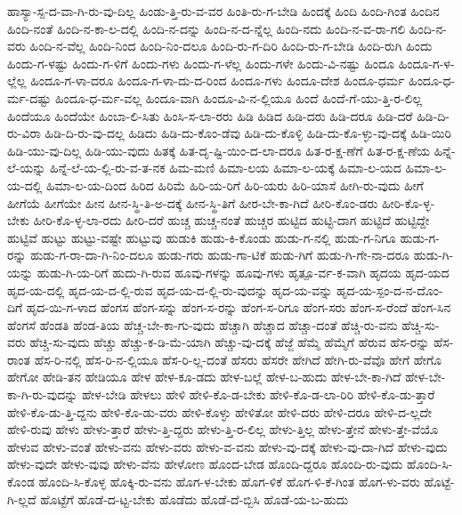 {ಹಾಸ್ಯಾ-ಸ್ಪ-ದ-ವಾ-ಗಿ-ರು-ವು-ದಿಲ್ಲ
ಹಿಂಡು-ತ್ತಿ-ರು-ವ-ವರ
ಹಿಂತಿ-ರು-ಗ-ಬೇಡಿ
ಹಿಂದಕ್ಕೆ
ಹಿಂದಿ
ಹಿಂದಿ-ಗಿಂತ
ಹಿಂದಿನ
ಹಿಂದಿ-ನಂತೆ
ಹಿಂದಿ-ನ-ಕಾ-ಲ-ದಲ್ಲಿ
ಹಿಂದಿ-ನ-ದನ್ನು
ಹಿಂದಿ-ನ-ದ-ನ್ನೆಲ್ಲ
ಹಿಂದಿ-ನದು
ಹಿಂದಿ-ನ-ವ-ರಾ-ಗಲಿ
ಹಿಂದಿ-ನ-ವರು
ಹಿಂದಿ-ನ-ವೆಲ್ಲ
ಹಿಂದಿ-ನಿಂದ
ಹಿಂದಿ-ನಿಂ-ದಲೂ
ಹಿಂದಿ-ರು-ಗ-ದಿರಿ
ಹಿಂದಿ-ರು-ಗ-ಬೇಡಿ
ಹಿಂದಿ-ರುಗಿ
ಹಿಂದು
ಹಿಂದು-ಗ-ಳಷ್ಟು
ಹಿಂದು-ಗ-ಳಿಗೆ
ಹಿಂದು-ಗಳು
ಹಿಂದು-ಗ-ಳೆಲ್ಲ
ಹಿಂದು-ಗಳೇ
ಹಿಂದು-ವಿ-ನಷ್ಟು
ಹಿಂದೂ
ಹಿಂದೂ-ಗ-ಳ-ಲ್ಲೆಲ್ಲ
ಹಿಂದೂ-ಗ-ಳಾ-ದರೂ
ಹಿಂದೂ-ಗ-ಳಾ-ದು-ದ-ರಿಂದ
ಹಿಂದೂ-ಗಳು
ಹಿಂದೂ-ದೇಶ
ಹಿಂದೂ-ಧರ್ಮ
ಹಿಂದೂ-ಧ-ರ್ಮ-ದಷ್ಟು
ಹಿಂದೂ-ಧ-ರ್ಮ-ವಲ್ಲ
ಹಿಂದೂ-ವಾಗಿ
ಹಿಂದೂ-ವಿ-ನ-ಲ್ಲಿಯೂ
ಹಿಂದೆ
ಹಿಂದೆ-ಗೆ-ಯು-ತ್ತಿ-ರ-ಲಿಲ್ಲ
ಹಿಂದೆಯೂ
ಹಿಂದೆಯೇ
ಹಿಂಬಾ-ಲಿ-ಸಿತು
ಹಿಂಸಿ-ಸ-ಲಾ-ರರು
ಹಿಡಿ
ಹಿಡಿದ
ಹಿಡಿ-ದರು
ಹಿಡಿ-ದರೂ
ಹಿಡಿ-ದರೆ
ಹಿಡಿ-ದಿ-ರು-ವಿರಾ
ಹಿಡಿ-ದಿ-ರು-ವು-ದಲ್ಲ
ಹಿಡಿದು
ಹಿಡಿ-ದು-ಕೊಂ-ಡೆವು
ಹಿಡಿ-ದು-ಕೊಳ್ಳಿ
ಹಿಡಿ-ದು-ಕೊ-ಳ್ಳು-ವು-ದಕ್ಕೆ
ಹಿಡಿ-ಯಿರಿ
ಹಿಡಿ-ಯು-ವು-ದಿಲ್ಲ
ಹಿಡಿ-ಯು-ವುದು
ಹಿತಕ್ಕೆ
ಹಿತ-ದೃ-ಷ್ಟಿ-ಯಿಂ-ದ-ಲಾ-ದರೂ
ಹಿತ-ರ-ಕ್ಷ-ಣೆಗೆ
ಹಿತ-ರ-ಕ್ಷ-ಣೆಯ
ಹಿನ್ನೆ-ಲೆ-ಯನ್ನು
ಹಿನ್ನೆ-ಲೆ-ಯ-ಲ್ಲಿ-ರು-ವ-ತ-ನಕ
ಹಿಮ-ಮಣಿ
ಹಿಮಾ-ಲಯ
ಹಿಮಾ-ಲ-ಯಕ್ಕೆ
ಹಿಮಾ-ಲ-ಯದ
ಹಿಮಾ-ಲ-ಯ-ದಲ್ಲಿ
ಹಿಮಾ-ಲ-ಯ-ದಿಂದ
ಹಿರಿದ
ಹಿರಿಮೆ
ಹಿರಿ-ಯ-ರಿಗೆ
ಹಿರಿ-ಯರು
ಹಿರಿ-ಯಾಸೆ
ಹೀಗಿ-ರು-ವುದು
ಹೀಗೆ
ಹೀಗೆಯೆ
ಹೀಗೆಯೇ
ಹೀನ
ಹೀನ-ಸ್ಥಿ-ತಿ-ಅ-ದಕ್ಕೆ
ಹೀನ-ಸ್ಥಿ-ತಿಗೆ
ಹೀರ-ಬೇ-ಕಾ-ಗಿದೆ
ಹೀರಿ-ಕೊಂ-ಡರು
ಹೀರಿ-ಕೊ-ಳ್ಳ-ಬೇಕು
ಹೀರಿ-ಕೊ-ಳ್ಳ-ಲಾ-ರದು
ಹೀರಿ-ದರೆ
ಹುಚ್ಚ
ಹುಚ್ಚ-ನಂತೆ
ಹುಚ್ಚರ
ಹುಟ್ಟಿದ
ಹುಟ್ಟಿ-ದಾಗ
ಹುಟ್ಟಿದೆ
ಹುಟ್ಟಿದ್ದೇ
ಹುಟ್ಟಿವೆ
ಹುಟ್ಟು
ಹುಟ್ಟು-ವಷ್ಟೇ
ಹುಟ್ಟುವು
ಹುಡುಕಿ
ಹುಡು-ಕಿ-ಕೊಂಡು
ಹುಡು-ಗ-ನಲ್ಲಿ
ಹುಡು-ಗ-ನಿಗೂ
ಹುಡು-ಗ-ರನ್ನು
ಹುಡು-ಗ-ರಾ-ದಾ-ಗಿ-ನಿಂ-ದಲೂ
ಹುಡು-ಗರು
ಹುಡು-ಗಾ-ಟಿಕೆ
ಹುಡು-ಗಿಗೆ
ಹುಡು-ಗಿ-ಗೇ-ನಾ-ದರೂ
ಹುಡು-ಗಿ-ಯನ್ನು
ಹುಡು-ಗಿ-ಯ-ರಿಗೆ
ಹುದು-ಗಿ-ರುವ
ಹೂವು-ಗಳನ್ನು
ಹೂವು-ಗಳು
ಹೃತ್ಪೂ-ರ್ವ-ಕ-ವಾಗಿ
ಹೃದಯ
ಹೃದ-ಯದ
ಹೃದ-ಯ-ದಲ್ಲಿ
ಹೃದ-ಯ-ದ-ಲ್ಲಿ-ರುವ
ಹೃದ-ಯ-ದ-ಲ್ಲಿ-ರು-ವುದನ್ನು
ಹೃದ-ಯ-ವನ್ನು
ಹೃದ-ಯ-ಸ್ಪಂ-ದ-ನ-ದೊಂ-ದಿಗೆ
ಹೃದ-ಯಿ-ಗ-ಳಾದ
ಹೆಂಗಸ
ಹೆಂಗ-ಸನ್ನು
ಹೆಂಗ-ಸ-ರನ್ನು
ಹೆಂಗ-ಸ-ರಿಗೂ
ಹೆಂಗ-ಸರು
ಹೆಂಗ-ಸ-ರೆಂದೆ
ಹೆಂಗ-ಸಿನ
ಹೆಂಗಸೆ
ಹೆಂಡತಿ
ಹೆಂಡ-ತಿಯ
ಹೆಚ್ಚ-ಬೇ-ಕಾ-ಗು-ವುದು
ಹೆಚ್ಚಾಗಿ
ಹೆಚ್ಚಾದ
ಹೆಚ್ಚಾ-ದಂತೆ
ಹೆಚ್ಚಿ-ರು-ವನು
ಹೆಚ್ಚಿ-ಸು-ವರು
ಹೆಚ್ಚಿ-ಸು-ವುದು
ಹೆಚ್ಚು
ಹೆಚ್ಚು-ಕ-ಡಿ-ಮೆ-ಯಾಗಿ
ಹೆಚ್ಚು-ವು-ದಕ್ಕೆ
ಹೆಜ್ಜೆ
ಹೆಮ್ಮೆ
ಹೆಮ್ಮೆಗೆ
ಹೆರುವ
ಹೆಸ-ರನ್ನು
ಹೆಸ-ರಾಂತ
ಹೆಸ-ರಿ-ನಲ್ಲಿ
ಹೆಸ-ರಿ-ನ-ಲ್ಲಿಯೂ
ಹೆಸ-ರಿ-ಲ್ಲ-ದಂತೆ
ಹೆಸರು
ಹೆಸರೇ
ಹೇಗಿದೆ
ಹೇಗಿ-ರು-ವೆವೊ
ಹೇಗೆ
ಹೇಗೊ
ಹೇಗೋ
ಹೇಡಿ-ತನ
ಹೇಡಿಯೂ
ಹೇಳ
ಹೇಳ-ಕೂ-ಡದು
ಹೇಳ-ಬಲ್ಲೆ
ಹೇಳ-ಬ-ಹುದು
ಹೇಳ-ಬೇ-ಕಾ-ಗಿದೆ
ಹೇಳ-ಬೇ-ಕಾ-ಗಿ-ರು-ವುದನ್ನು
ಹೇಳ-ಬೇಡಿ
ಹೇಳಲು
ಹೇಳಿ
ಹೇಳಿ-ಕೊ-ಡ-ಬೇಕು
ಹೇಳಿ-ಕೊ-ಡ-ಲಾ-ರಿರಿ
ಹೇಳಿ-ಕೊ-ಡು-ತ್ತಾರೆ
ಹೇಳಿ-ಕೊ-ಡು-ತ್ತಿ-ದ್ದನು
ಹೇಳಿ-ಕೊ-ಡು-ವರು
ಹೇಳಿ-ಕೊಳ್ಳು
ಹೇಳಿತೋ
ಹೇಳಿ-ದರು
ಹೇಳಿ-ದರೂ
ಹೇಳಿ-ದ-ಲ್ಲದೇ
ಹೇಳಿ-ರುವು
ಹೇಳು
ಹೇಳು-ತ್ತಾರೆ
ಹೇಳು-ತ್ತಿ-ದ್ದರು
ಹೇಳು-ತ್ತಿ-ರ-ಲಿಲ್ಲ
ಹೇಳು-ತ್ತಿಲ್ಲ
ಹೇಳು-ತ್ತೇನೆ
ಹೇಳು-ತ್ತೇ-ವೆಯೊ
ಹೇಳುವ
ಹೇಳು-ವಂತೆ
ಹೇಳು-ವನು
ಹೇಳು-ವರು
ಹೇಳು-ವ-ವನು
ಹೇಳು-ವು-ದಕ್ಕೆ
ಹೇಳು-ವು-ದಾ-ಗಿದೆ
ಹೇಳು-ವುದು
ಹೇಳು-ವುದೇ
ಹೇಳು-ವುವು
ಹೇಳು-ವೆನು
ಹೇಳೋಣ
ಹೊಂದ-ಬೇಡ
ಹೊಂದಿ-ದ್ದರೂ
ಹೊಂದಿ-ರು-ವುದು
ಹೊಂದಿ-ಸಿ-ಕೊಂಡ
ಹೊಂದಿ-ಸಿ-ಕೊಳ್ಳ
ಹೊಕ್ಕಿ-ರು-ವನು
ಹೊಗ-ಳ-ಬೇಕು
ಹೊಗ-ಳಿಕೆ
ಹೊಗ-ಳಿ-ಕೆ-ಗಿಂತ
ಹೊಗ-ಳು-ವರು
ಹೊಟ್ಟೆ-ಗಿ-ಲ್ಲದೆ
ಹೊಟ್ಟೆಗೆ
ಹೊಡೆ-ದ-ಟ್ಟ-ಬೇಕು
ಹೊಡೆದು
ಹೊಡೆ-ದೆ-ಬ್ಬಿಸಿ
ಹೊಡೆ-ಯ-ಬ-ಹುದು
}
